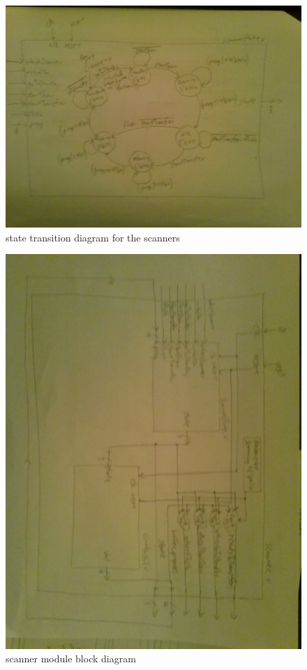 \documentclass{article}
\begin{document}
      \begin{figure}[H]
        \centering
        \includegraphics[width=0.75\linewidth]{figures/block_diagrams/scannerState.jpg}
        \caption{state transition diagram for the scanners}
        \label{fig:scannerState_FSM}
      \end{figure}

      \begin{figure}[H]
        \centering
        \includegraphics[width=0.75\linewidth]{figures/block_diagrams/scanner.jpg}
        \caption{scanner module block diagram}
        \label{fig:scanner_blockdiagram}
      \end{figure}
\end{document}
